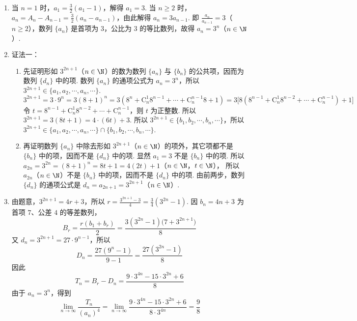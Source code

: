 \documentclass[UTF8,a4paper,oneside,11pt]{ctexbook}
\begin{document}
\begin{solution}
\begin{enumerate}
\item 当 \(n=1\) 时，\(a_{1}=\frac{3}{2}(a_{1}-1)\)，解得 \(a_{1}=3\).
当 \(n\geqslant2\) 时，\(a_{n}=A_{n}-A_{n-1}=\frac{3}{2}(a_{n}-a_{n-1})\)，由此解得 \(a_{n}=3a_{n-1}\).
即 \(\frac{a_{n}}{a_{n-1}}=3\)（\(n\geqslant2\)），数列 \(\{a_{n}\}\) 是首项为 \(3\)，公比为 \(3\) 的等比数列，故得 \(a_{n}=3^{n}\)（\(n\in\N\)）.

\item 证法一：
\begin{enumerate}
\item 先证明形如 \(3^{2n+1}\)（\(n\in\N\)）的数为数列 \(\{a_{n}\}\) 与 \(\{b_{n}\}\) 的公共项，因而为数列 \(\{d_{n}\}\) 中的项.
数列 \(\{a_{n}\}\) 的通项公式为 \(a_{n}=3^{n}\)，所以 \(3^{2n+1}\in\{a_{1},a_{2},\cdots,a_{n},\cdots\}\).
\[
3^{2n+1}=3\cdot9^{n}=3(8+1)^{n}=3(8^{n}+\mathrm C_{n}^{1}8^{n-1}+\cdots+\mathrm C_{n}^{n-1}8+1)
=3\bigl[8(8^{n-1}+\mathrm C_{n}^{1}8^{n-2}+\cdots+\mathrm C_{n}^{n-1})+1\bigr]
\]
令 \(t=8^{n-1}+\mathrm C_{n}^{1}8^{n-2}+\cdots+\mathrm C_{n}^{n-1}\)，则 \(t\) 为正整数. 所以 \(3^{2n+1}=3(8t+1)=4\cdot(6t)+3\).
所以 \(3^{2n+1}\in\{b_{1},b_{2},\cdots,b_{n},\cdots\}\)，所以 \(3^{2n+1}\in\{a_{1},a_{2},\cdots,a_{n},\cdots\}\cap\{b_{1},b_{2},\cdots,b_{n},\cdots\}\).

\item 再证明数列 \(\{a_{n}\}\) 中除去形如 \(3^{2n+1}\)（\(n\in\N\)）的项外，其它项都不是 \(\{b_{n}\}\) 中的项，因而不是 \(\{d_{n}\}\) 中的项.
显然 \(a_{1}=3\) 不是 \(\{b_{n}\}\) 中的项. 所以 \(a_{2n}=3^{2n}=(8+1)^{n}=8t+1=4(2t)+1\)（\(n\in\N\)，\(t\in\N\)），
所以 \(a_{2n}\)（\(n\in\N\)）不是 \(\{b_{n}\}\) 中的项，因而不是 \(\{d_{n}\}\) 中的项.
由前两步，数列 \(\{d_{n}\}\) 的通项公式是 \(d_{n}=a_{2n+1}=3^{2n+1}\)（\(n\in\N\)）.

\end{enumerate}

\item
由题意，\(3^{2n+1}=4r+3\)，所以 \(r=\frac{3^{2n+1}-3}{4}=\frac{3}{4}\left(3^{2n}-1\right)\). 因 \(b_n=4n+3\) 为首项 \(7\)、公差 \(4\) 的等差数列，
\[
B_r=\frac{r(b_1+b_r)}{2}
=\frac{3(3^{2n}-1)\bigl(7+3^{2n+1}\bigr)}{8}
\]
又 \(d_n=3^{2n+1}=27\cdot9^{n-1}\)，所以
\[
D_n=\frac{27(9^n-1)}{9-1}=\frac{27(3^{2n}-1)}{8}
\]
因此
\[
T_n=B_r-D_n=\frac{9\cdot3^{4n}-15\cdot3^{2n}+6}{8}
\]
由于 \(a_n=3^n\)，得到
\[
\lim_{n\to\infty}\frac{T_n}{(a_n)^4}
=\lim_{n\to\infty}\frac{9\cdot3^{4n}-15\cdot3^{2n}+6}{8\cdot3^{4n}}
=\frac{9}{8}
\]
\end{enumerate}
\end{solution}

\end{document}
